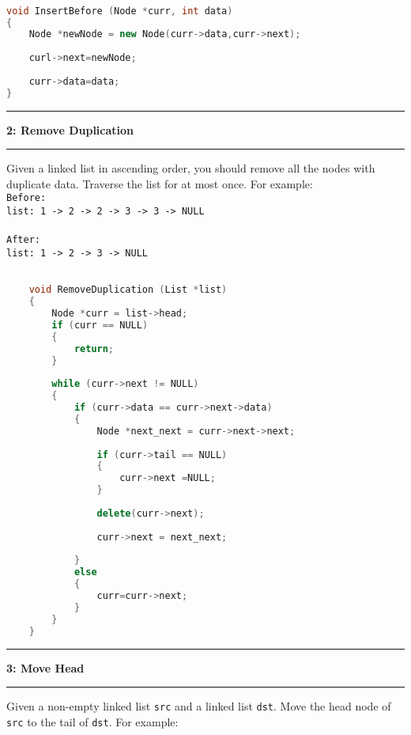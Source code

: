 \documentclass[10.5pt]{article}
\newcommand\question[2]{\vspace{.25in}\hrule\textbf{#1: #2}\vspace{.5em}\hrule\vspace{.10in}}
\begin{document}
\hrulefill
\begin{lstlisting}[language=C++]

void InsertBefore (Node *curr, int data)
{
    Node *newNode = new Node(curr->data,curr->next);
    
    curl->next=newNode;
    
    curr->data=data;
}

\end{lstlisting}

\pagebreak

\question{2}{Remove Duplication}
Given a linked list in ascending order, you should remove all the nodes with duplicate data. Traverse the list for at most once. For example: \\

\texttt{Before:}\\
\texttt{list: 1 -> 2 -> 2 -> 3 -> 3 -> NULL}\\
\\
\texttt{After:}\\
\texttt{list: 1 -> 2 -> 3 -> NULL}\\


\hrulefill
\begin{lstlisting}[language=C++]

    void RemoveDuplication (List *list)
    {
        Node *curr = list->head;
        if (curr == NULL) 
        {
            return;
        }
        
        while (curr->next != NULL)
        {
            if (curr->data == curr->next->data)
            {
                Node *next_next = curr->next->next;
                            
                if (curr->tail == NULL)
                {
                    curr->next =NULL;
                }
                
                delete(curr->next);
                
                curr->next = next_next;
    
            }
            else
            {
                curr=curr->next;
            }
        }
    }
    \end{lstlisting}
    \pagebreak
    
    
    \question{3}{Move Head}
    Given a non-empty linked list \texttt{src} and a linked list \texttt{dst}. Move the head node of \texttt{src} to the tail of \texttt{dst}. For example: \\
    
\end{document}
